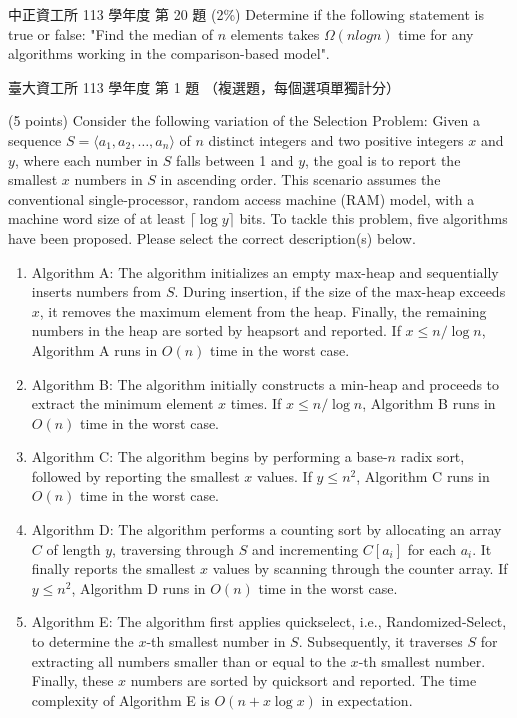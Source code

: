 \begin{pastexam}[label={px:sel-1}]{中正資工所 113 學年度 第 20 題}
(2\%) Determine if the following statement is true or false: "Find the median of $n$ elements takes $\Omega(nlogn)$ time for any algorithms working in the comparison-based model".
\end{pastexam}

\begin{pastexam}[label={px:sel-2}]{臺大資工所 113 學年度 第 1 題}
（複選題，每個選項單獨計分）

(5 points) Consider the following variation of the Selection Problem: Given a sequence $S=\langle a_1,a_2,\ldots,a_n\rangle$ of $n$ distinct integers and two positive integers $x$ and $y$, where each number in $S$ falls between 1 and $y$, the goal is to report the smallest $x$ numbers in $S$ in ascending order. This scenario assumes the conventional single-processor, random access machine (RAM) model, with a machine word size of at least $\lceil\log y\rceil$ bits. To tackle this problem, five algorithms have been proposed. Please select the correct description(s) below.
\begin{enumerate}[label=\Alph*.]
\item Algorithm A: The algorithm initializes an empty max-heap and sequentially inserts numbers from $S$. During insertion, if the size of the max-heap exceeds $x$, it removes the maximum element from the heap. Finally, the remaining numbers in the heap are sorted by heapsort and reported. If $x\le n/\log n$, Algorithm A runs in $O(n)$ time in the worst case.
\item Algorithm B: The algorithm initially constructs a min-heap and proceeds to extract the minimum element $x$ times. If $x\le n/\log n$, Algorithm B runs in $O(n)$ time in the worst case.
\item Algorithm C: The algorithm begins by performing a base-$n$ radix sort, followed by reporting the smallest $x$ values. If $y\le n^2$, Algorithm C runs in $O(n)$ time in the worst case.
\item Algorithm D: The algorithm performs a counting sort by allocating an array $C$ of length $y$, traversing through $S$ and incrementing $C[a_i]$ for each $a_i$. It finally reports the smallest $x$ values by scanning through the counter array. If $y\le n^2$, Algorithm D runs in $O(n)$ time in the worst case.
\item Algorithm E: The algorithm first applies quickselect, i.e., Randomized-Select, to determine the $x$-th smallest number in $S$. Subsequently, it traverses $S$ for extracting all numbers smaller than or equal to the $x$-th smallest number. Finally, these $x$ numbers are sorted by quicksort and reported. The time complexity of Algorithm E is $O(n+x\log x)$ in expectation.
\end{enumerate}
\end{pastexam}

